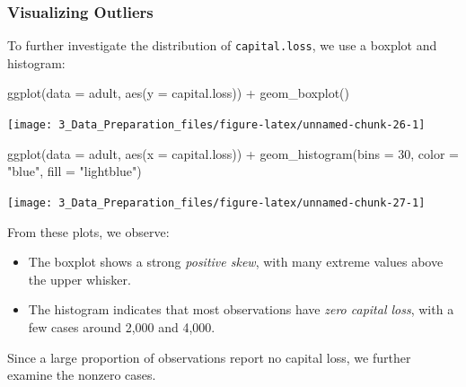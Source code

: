 \documentclass[
  11pt,
]{book}
\makeatletter
\newenvironment{Shaded}{}{}
\newcommand{\AttributeTok}[1]{#1}
\newcommand{\DecValTok}[1]{#1}
\newcommand{\FunctionTok}[1]{#1}
\newcommand{\NormalTok}[1]{#1}
\newcommand{\SpecialCharTok}[1]{\textcolor[rgb]{0.39,0.39,0.39}{#1}}
\newcommand{\StringTok}[1]{\textcolor[rgb]{0.39,0.39,0.39}{#1}}
\providecommand{\tightlist}{%
  \setlength{\itemsep}{0pt}\setlength{\parskip}{0pt}}
\newenvironment{kframe}{%
\medskip{}
\setlength{\fboxsep}{.8em}
 \def\at@end@of@kframe{}%
 \ifinner\ifhmode%
  \def\at@end@of@kframe{\end{minipage}}%
  \begin{minipage}{\columnwidth}%
 \fi\fi%
 \def\FrameCommand##1{\hskip\@totalleftmargin \hskip-\fboxsep
 \colorbox{shadecolor}{##1}\hskip-\fboxsep
     \hskip-\linewidth \hskip-\@totalleftmargin \hskip\columnwidth}%
 \MakeFramed {\advance\hsize-\width
   \@totalleftmargin\z@ \linewidth\hsize
   \@setminipage}}%
 {\par\unskip\endMakeFramed%
 \at@end@of@kframe}
\renewenvironment{Shaded}{\begin{kframe}}{\end{kframe}}
\theoremstyle{definition}
\theoremstyle{definition}
\theoremstyle{definition}
\theoremstyle{definition}
\theoremstyle{remark}
\makeatother
\begin{document}
\subsubsection*{Visualizing Outliers}\label{visualizing-outliers}


To further investigate the distribution of \texttt{capital.loss}, we use a boxplot and histogram:

\begin{Shaded}
\begin{Highlighting}[]
\FunctionTok{ggplot}\NormalTok{(}\AttributeTok{data =}\NormalTok{ adult, }\FunctionTok{aes}\NormalTok{(}\AttributeTok{y =}\NormalTok{ capital.loss)) }\SpecialCharTok{+}
     \FunctionTok{geom\_boxplot}\NormalTok{()}
\end{Highlighting}
\end{Shaded}

\begin{center}\texttt{[image: 3\_Data\_Preparation\_files/figure-latex/unnamed-chunk-26-1]} \end{center}

\begin{Shaded}
\begin{Highlighting}[]
\FunctionTok{ggplot}\NormalTok{(}\AttributeTok{data =}\NormalTok{ adult, }\FunctionTok{aes}\NormalTok{(}\AttributeTok{x =}\NormalTok{ capital.loss)) }\SpecialCharTok{+}
     \FunctionTok{geom\_histogram}\NormalTok{(}\AttributeTok{bins =} \DecValTok{30}\NormalTok{, }\AttributeTok{color =} \StringTok{"blue"}\NormalTok{, }\AttributeTok{fill =} \StringTok{"lightblue"}\NormalTok{)}
\end{Highlighting}
\end{Shaded}

\begin{center}\texttt{[image: 3\_Data\_Preparation\_files/figure-latex/unnamed-chunk-27-1]} \end{center}

From these plots, we observe:

\begin{itemize}
\tightlist
\item
  The boxplot shows a strong \emph{positive skew}, with many extreme values above the upper whisker.\\
\item
  The histogram indicates that most observations have \emph{zero capital loss}, with a few cases around 2,000 and 4,000.
\end{itemize}

Since a large proportion of observations report no capital loss, we further examine the nonzero cases.
\end{document}
